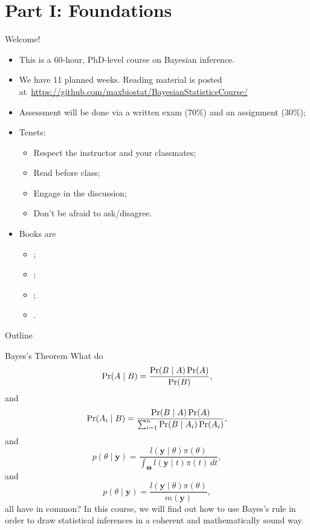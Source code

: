 \begin{frame}
\titlepage %
\end{frame}
\section{Part I: Foundations}
\begin{frame}{Welcome!}
\begin{itemize}
 \item This is a 60-hour, PhD-level course on Bayesian inference.
 \item We have 11 planned weeks. Reading material is posted at~\url{https://github.com/maxbiostat/BayesianStatisticsCourse/}
 \item Assessment will be done via a written exam (70\%) and an assignment ($30\%$);
 \item Tenets:
 \begin{itemize}
  \item Respect the instructor and your classmates;
  \item Read before class;
  \item Engage in the discussion;
  \item Don't be afraid to ask/disagree.
 \end{itemize}
 \item Books are
 \begin{itemize}
  \item  \cite{Robert2007};
  \item \cite{Hoff2009};
  \item  \cite{Schervish1995};
  \item \cite{Bernardo2000}.  
 \end{itemize}
\end{itemize}
\end{frame}
\begin{frame}{Outline}
    \tableofcontents
\end{frame}
\begin{frame}{Bayes's Theorem}
What do
\begin{equation}
 \label{eq:BT_1}
 \operatorname{Pr}(A \mid B) = \frac{\operatorname{Pr}(B \mid A)\operatorname{Pr}(A)}{\operatorname{Pr}(B)},
\end{equation}
and
\begin{equation}
 \label{eq:BT_2}
 \operatorname{Pr}(A_i \mid B) = \frac{\operatorname{Pr}(B \mid A)\operatorname{Pr}(A)}{\sum_{i=1}^n \operatorname{Pr}(B \mid A_i)\operatorname{Pr}(A_i)},
\end{equation}
and
\begin{equation}
 \label{eq:BT_3}
  p(\theta \mid \boldsymbol{y}) = \frac{l(\boldsymbol{y} \mid \theta)\pi(\theta)}{\int_{\boldsymbol{\Theta}} l(\boldsymbol{y} \mid t)\pi(t) \, dt},
\end{equation}
and
\begin{equation}
 \label{eq:BT_4}
  p(\theta \mid \boldsymbol{y}) = \frac{l(\boldsymbol{y} \mid \theta)\pi(\theta)}{m(\boldsymbol{y})},
\end{equation}
all have in common?
In this course, we will find out how to use Bayes's rule in order to draw statistical inferences in a coherent and mathematically sound way.
\end{frame}
